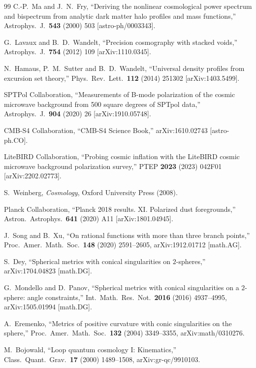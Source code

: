 \documentclass[12pt]{article}
\theoremstyle{definition}
\begin{document}
\begin{thebibliography}{99}
C.-P.~Ma and J.~N.~Fry,
``Deriving the nonlinear cosmological power spectrum and bispectrum from
analytic dark matter halo profiles and mass functions,''
Astrophys.\ J.\ \textbf{543} (2000) 503 [astro-ph/0003343].

G.~Lavaux and B.~D.~Wandelt,
``Precision cosmography with stacked voids,''
Astrophys.\ J.\ \textbf{754} (2012) 109 [arXiv:1110.0345].

N.~Hamaus, P.~M.~Sutter and B.~D.~Wandelt,
``Universal density profiles from excursion set theory,''
Phys.\ Rev.\ Lett.\ \textbf{112} (2014) 251302 [arXiv:1403.5499].

SPTPol Collaboration,
``Measurements of B-mode polarization of the cosmic microwave background
from 500 square degrees of SPTpol data,''
Astrophys.\ J.\ \textbf{904} (2020) 26 [arXiv:1910.05748].

CMB-S4 Collaboration,
``CMB-S4 Science Book,''
arXiv:1610.02743 [astro-ph.CO].

LiteBIRD Collaboration,
``Probing cosmic inflation with the LiteBIRD cosmic microwave background
polarization survey,''
PTEP \textbf{2023} (2023) 042F01 [arXiv:2202.02773].

S.~Weinberg,
\textit{Cosmology},
Oxford University Press (2008).

Planck Collaboration,
``Planck 2018 results. XI. Polarized dust foregrounds,''
Astron.\ Astrophys.\ \textbf{641} (2020) A11 [arXiv:1801.04945].

J.~Song and B.~Xu,
``On rational functions with more than three branch points,''
Proc.\ Amer.\ Math.\ Soc.\ \textbf{148} (2020) 2591--2605,
arXiv:1912.01712 [math.AG].

S.~Dey,
``Spherical metrics with conical singularities on $2$-spheres,''
arXiv:1704.04823 [math.DG].

G.~Mondello and D.~Panov,
``Spherical metrics with conical singularities on a $2$-sphere:
angle constraints,''
Int.\ Math.\ Res.\ Not.\ \textbf{2016} (2016) 4937--4995,
arXiv:1505.01994 [math.DG].

A.~Eremenko,
``Metrics of positive curvature with conic singularities on the sphere,''
Proc.\ Amer.\ Math.\ Soc.\ \textbf{132} (2004) 3349--3355,
arXiv:math/0310276.

M.~Bojowald,
``Loop quantum cosmology I: Kinematics,''
Class.\ Quant.\ Grav.\ \textbf{17} (2000) 1489--1508,
arXiv:gr-qc/9910103.


\end{thebibliography}
\end{document}
